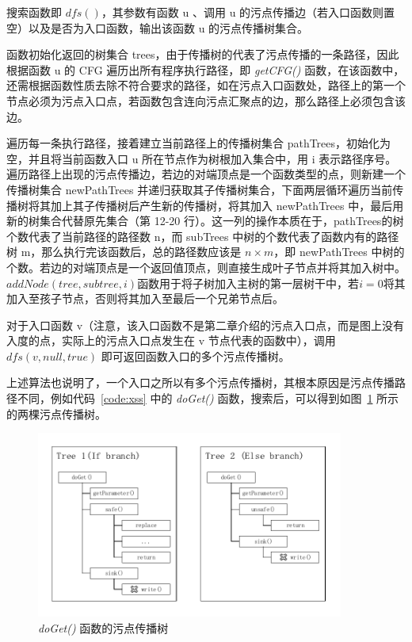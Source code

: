 搜索函数即 $dfs()$，其参数有函数 u 、调用 u 的污点传播边（若入口函数则置空）以及是否为入口函数，输出该函数 u 的污点传播树集合。

函数初始化返回的树集合 trees，由于传播树的代表了污点传播的一条路径，因此根据函数 u 的 CFG 遍历出所有程序执行路径，即 \textit{getCFG()} 函数，在该函数中，还需根据函数性质去除不符合要求的路径，如在污点入口函数处，路径上的第一个节点必须为污点入口点，若函数包含连向污点汇聚点的边，那么路径上必须包含该边。

遍历每一条执行路径，接着建立当前路径上的传播树集合 pathTrees，初始化为空，并且将当前函数入口 u 所在节点作为树根加入集合中，用 i 表示路径序号。遍历路径上出现的污点传播边，若边的对端顶点是一个函数类型的点，则新建一个传播树集合 newPathTrees 并递归获取其子传播树集合，下面两层循环遍历当前传播树将其加上其子传播树后产生新的传播树，将其加入 newPathTrees 中，最后用新的树集合代替原先集合（第 12-20 行）。这一列的操作本质在于，pathTrees的树个数代表了当前路径的路径数 n，而 subTrees 中树的个数代表了函数内有的路径树 m，那么执行完该函数后，总的路径数应该是 $n \times m$，即 newPathTrees 中树的个数。若边的对端顶点是一个返回值顶点，则直接生成叶子节点并将其加入树中。
$addNode(tree, subtree, i)$函数用于将子树加入主树的第一层树干中，若$i=0$将其加入至孩子节点，否则将其加入至最后一个兄弟节点后。

对于入口函数 v（注意，该入口函数不是第二章介绍的污点入口点，而是图上没有入度的点，实际上的污点入口点发生在 v 节点代表的函数中），调用$dfs(v, null,true)$ 即可返回函数入口的多个污点传播树。

上述算法也说明了，一个入口之所以有多个污点传播树，其根本原因是污点传播路径不同，例如代码~\ref{code:xss} 中的 \textit{doGet()} 函数，搜索后，可以得到如图~\ref{taintTree} 所示的两棵污点传播树。

\begin{figure}[!htb]
    \centering
    \includegraphics[width=0.9\textwidth]{FIGs/chapter4/taintTree.pdf}
    \caption{\textit{doGet()} 函数的污点传播树}\label{taintTree}
\end{figure}


